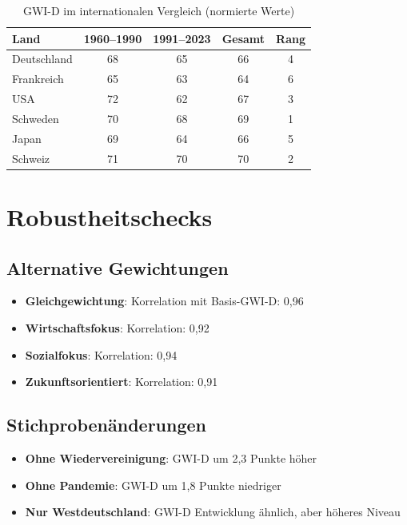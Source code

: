 \begin{table}[ht]
\centering
\begin{tabular}{lcccc}
\toprule
\textbf{Land} & \textbf{1960--1990} & \textbf{1991--2023} & \textbf{Gesamt} & \textbf{Rang} \\
\midrule
Deutschland & 68 & 65 & 66 & 4 \\
Frankreich & 65 & 63 & 64 & 6 \\
USA & 72 & 62 & 67 & 3 \\
Schweden & 70 & 68 & 69 & 1 \\
Japan & 69 & 64 & 66 & 5 \\
Schweiz & 71 & 70 & 70 & 2 \\
\bottomrule
\end{tabular}
\caption{GWI-D im internationalen Vergleich (normierte Werte)}
\label{tab:internationaler-vergleich}
\end{table}

\section{Robustheitschecks}

\subsection{Alternative Gewichtungen}

\begin{itemize}
\item \textbf{Gleichgewichtung}: Korrelation mit Basis-GWI-D: 0,96
\item \textbf{Wirtschaftsfokus}: Korrelation: 0,92
\item \textbf{Sozialfokus}: Korrelation: 0,94
\item \textbf{Zukunftsorientiert}: Korrelation: 0,91
\end{itemize}

\subsection{Stichprobenänderungen}

\begin{itemize}
\item \textbf{Ohne Wiedervereinigung}: GWI-D um 2,3 Punkte höher
\item \textbf{Ohne Pandemie}: GWI-D um 1,8 Punkte niedriger
\item \textbf{Nur Westdeutschland}: GWI-D Entwicklung ähnlich, aber höheres Niveau
\end{itemize}

